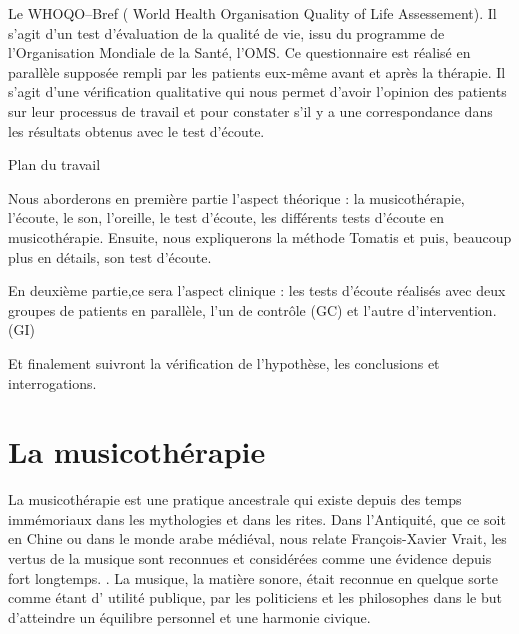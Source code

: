 	
	
        
   Le WHOQO--Bref ( World Health
   Organisation Quality of Life Assessement). Il s'agit d'un test d'évaluation de la qualité de vie, issu du
	programme de l'Organisation Mondiale de la Santé, l'OMS.
	Ce questionnaire est réalisé en parallèle supposée rempli par les patients eux-même  avant et après la thérapie.
	Il s'agit d'une vérification qualitative qui nous permet
        d'avoir l'opinion des patients sur leur processus de travail
        et  pour constater s'il y a une correspondance dans 
        les résultats obtenus avec le test d'écoute. 
	
	
	 
Plan du travail

Nous aborderons en première partie l'aspect théorique : la musicothérapie, l'écoute, le son, l'oreille, le 
test d'écoute, les différents tests d'écoute en musicothérapie.  Ensuite, nous 
expliquerons  la méthode Tomatis
et puis, beaucoup plus en détails, son test d'écoute.
 
En deuxième partie,ce sera l'aspect clinique : les tests d'écoute réalisés  avec deux groupes 
de patients en parallèle, l'un de contrôle (GC) et l'autre d'intervention.(GI)

Et finalement suivront la vérification de l'hypothèse, les conclusions et 
interrogations. 


	


\chapter{La musicothérapie}


La musicothérapie est une pratique ancestrale qui existe depuis des
temps immémoriaux dans les mythologies et dans les rites. Dans l'Antiquité, que ce soit en Chine ou dans le monde arabe 
médiéval, nous relate François-Xavier Vrait,  	 
les vertus de la musique sont reconnues et considérées comme une évidence depuis 
fort longtemps. 
  \autocite[ch. III, p. 
96]{vrait_musicotherapie_2018}.
La musique, la matière sonore, était  reconnue en quelque sorte comme étant d' utilité
publique, 
par les  politiciens  et les philosophes dans le but d'atteindre un
équilibre personnel et une harmonie civique.
 	 
